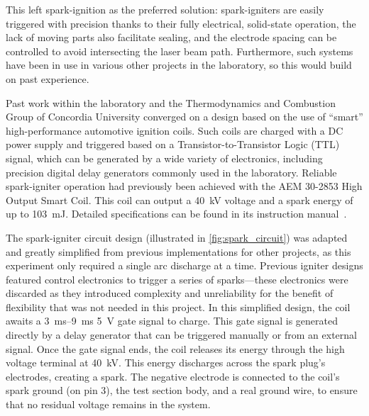             This left spark-ignition as the preferred solution: spark-igniters are easily triggered with precision thanks to their fully electrical, solid-state operation, the lack of moving parts also facilitate sealing, and the electrode spacing can be controlled to avoid intersecting the laser beam path. Furthermore, such systems have been in use in various other projects in the laboratory, so this would build on past experience.

            Past work within the laboratory and the Thermodynamics and Combustion Group of Concordia University converged on a design based on the use of ``smart'' high-performance automotive ignition coils. Such coils are charged with a DC power supply and triggered based on a Transistor-to-Transistor Logic (TTL) signal, which can be generated by a wide variety of electronics, including precision digital delay generators commonly used in the laboratory. Reliable spark-igniter operation had previously been achieved with the AEM 30-2853 High Output Smart Coil. This coil can output a \qty{40}{kV} voltage and a spark energy of up to \qty{103}{mJ}. Detailed specifications can be found in its instruction manual~\cite{aemperformanceelectronicsInstructionManual302853}.
            
            The spark-igniter circuit design (illustrated in \autoref{fig:spark_circuit}) was adapted and greatly simplified from previous implementations for other projects, as this experiment only required a single arc discharge at a time. Previous igniter designs featured control electronics to trigger a series of sparks---these electronics were discarded as they introduced complexity and unreliability for the benefit of flexibility that was not needed in this project. In this simplified design, the coil awaits a \qtyrange{3}{9}{ms} 5~V gate signal to charge. This gate signal is generated directly by a delay generator that can be triggered manually or from an external signal. Once the gate signal ends, the coil releases its energy through the high voltage terminal at \qty{40}{kV}. This energy discharges across the spark plug's electrodes, creating a spark. The negative electrode is connected to the coil's spark ground (on pin 3), the test section body, and a real ground wire, to ensure that no residual voltage remains in the system.


